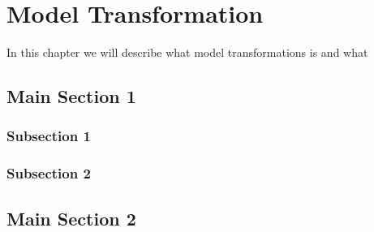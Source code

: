 
\chapter{Model Transformation} %

\label{Chapte3} %


In this chapter we will describe what model transformations is and what 

\section{Main Section 1}



\subsection{Subsection 1}




\subsection{Subsection 2}



\section{Main Section 2}

